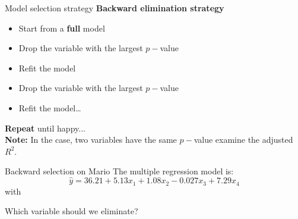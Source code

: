 \documentclass[12pt,a4paper]{beamer}
\begin{document}
		\begin{frame}{Model selection strategy}
			\textbf{Backward elimination strategy}
			\begin{itemize}
				\item Start from a \textbf{full} model
				\item Drop the variable with the largest $p-$value
				\item Refit the model
				\item Drop the variable with the largest $p-$value
				\item Refit the model\dots
			\end{itemize}
			\textbf{Repeat} until happy...\\
			\textbf{Note:} In the case, two variables have the same $p-$value examine the adjusted $R^2.$
		\end{frame}
		\begin{frame}{Backward selection on Mario}
			\small
			The multiple regression model is:
			\[\hat{y} = 36.21 + 5.13x_1 + 1.08x_2 - 0.027x_3 + 7.29x_4\]
			with 
			\begin{table}[ht]
			
			
			\end{table}
Which variable should we eliminate?			
		\end{frame}
\end{document}
